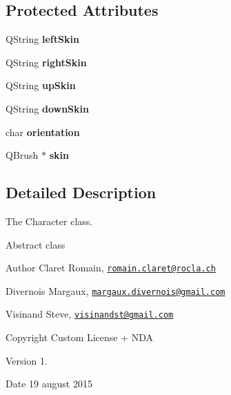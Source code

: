 \subsection*{Protected Attributes}
\begin{DoxyCompactItemize}
\item 
\hypertarget{class_g___character_a96db59ae9bb0bb1b45f83a3c8e03ffa1}{}Q\+String {\bfseries left\+Skin}\label{class_g___character_a96db59ae9bb0bb1b45f83a3c8e03ffa1}

\item 
\hypertarget{class_g___character_a0e7c4039a5745a5a75c815c25cb6ddaf}{}Q\+String {\bfseries right\+Skin}\label{class_g___character_a0e7c4039a5745a5a75c815c25cb6ddaf}

\item 
\hypertarget{class_g___character_a97cd2fdbe5c326ca678368fa38abba60}{}Q\+String {\bfseries up\+Skin}\label{class_g___character_a97cd2fdbe5c326ca678368fa38abba60}

\item 
\hypertarget{class_g___character_a4347f4ce74cd0ccf3cf02967c33e6f76}{}Q\+String {\bfseries down\+Skin}\label{class_g___character_a4347f4ce74cd0ccf3cf02967c33e6f76}

\item 
\hypertarget{class_g___character_aae3cd5c98277f1ddcef5853244425adf}{}char {\bfseries orientation}\label{class_g___character_aae3cd5c98277f1ddcef5853244425adf}

\item 
\hypertarget{class_g___character_a4682ce51e77990e551aded45bdf6376c}{}Q\+Brush $\ast$ {\bfseries skin}\label{class_g___character_a4682ce51e77990e551aded45bdf6376c}

\end{DoxyCompactItemize}


\subsection{Detailed Description}
The Character class. 

Abstract class \begin{DoxyAuthor}{Author}
Claret Romain, \href{mailto:romain.claret@rocla.ch}{\tt romain.\+claret@rocla.\+ch} 

Divernois Margaux, \href{mailto:margaux.divernois@gmail.com}{\tt margaux.\+divernois@gmail.\+com} 

Visinand Steve, \href{mailto:visinandst@gmail.com}{\tt visinandst@gmail.\+com} 
\end{DoxyAuthor}
\begin{DoxyCopyright}{Copyright}
Custom License + N\+D\+A 
\end{DoxyCopyright}
\begin{DoxyVersion}{Version}
1. 
\end{DoxyVersion}
\begin{DoxyDate}{Date}
19 august 2015 
\end{DoxyDate}


